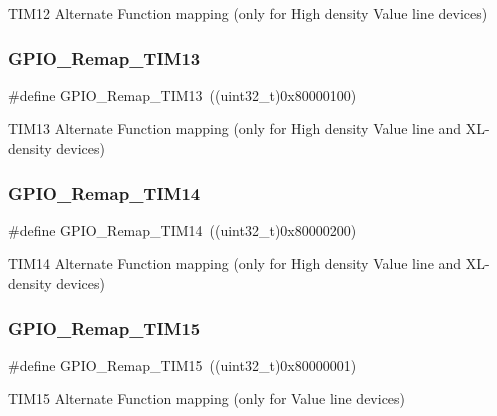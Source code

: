 T\+I\+M12 Alternate Function mapping (only for High density Value line devices) \mbox{\label{group___g_p_i_o___remap__define_ga72f5da86ed94f3be978cd841f7cd37cb}} 
\subsubsection{\texorpdfstring{GPIO\_Remap\_TIM13}{GPIO\_Remap\_TIM13}}
{\footnotesize\ttfamily \#define G\+P\+I\+O\+\_\+\+Remap\+\_\+\+T\+I\+M13~((uint32\+\_\+t)0x80000100)}

T\+I\+M13 Alternate Function mapping (only for High density Value line and X\+L-\/density devices) \mbox{\label{group___g_p_i_o___remap__define_gaa2ae554ed69ad3368c2cd7db678b3fd0}} 
\subsubsection{\texorpdfstring{GPIO\_Remap\_TIM14}{GPIO\_Remap\_TIM14}}
{\footnotesize\ttfamily \#define G\+P\+I\+O\+\_\+\+Remap\+\_\+\+T\+I\+M14~((uint32\+\_\+t)0x80000200)}

T\+I\+M14 Alternate Function mapping (only for High density Value line and X\+L-\/density devices) \mbox{\label{group___g_p_i_o___remap__define_gaead5c447875e8b384945424845452b82}} 
\subsubsection{\texorpdfstring{GPIO\_Remap\_TIM15}{GPIO\_Remap\_TIM15}}
{\footnotesize\ttfamily \#define G\+P\+I\+O\+\_\+\+Remap\+\_\+\+T\+I\+M15~((uint32\+\_\+t)0x80000001)}

T\+I\+M15 Alternate Function mapping (only for Value line devices) \mbox{\label{group___g_p_i_o___remap__define_gac9d612f9f9f9f66faecbdbbc29d2ac61}} 
